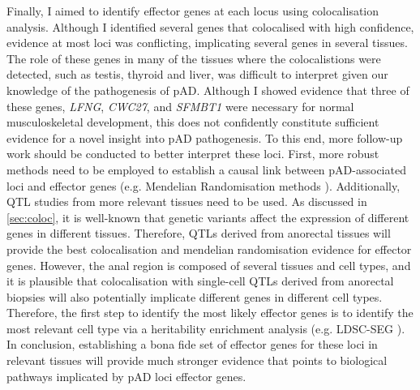 Finally, I aimed to identify effector genes at each locus using colocalisation analysis. Although I identified several genes that colocalised with high confidence, evidence at most loci was conflicting, implicating several genes in several tissues. The role of these genes in many of the tissues where the colocalistions were detected, such as testis, thyroid and liver, was difficult to interpret given our knowledge of the pathogenesis of pAD. Although I showed evidence that three of these genes, \textit{LFNG}, \textit{CWC27}, and \textit{SFMBT1} were necessary for normal musculoskeletal development, this does not confidently constitute sufficient evidence for a novel insight into pAD pathogenesis. To this end, more follow-up work should be conducted to better interpret these loci. First, more robust methods need to be employed to establish a causal link between pAD-associated loci and effector genes (e.g. Mendelian Randomisation methods \cite{Sanderson2022-nm}). Additionally, QTL studies from more relevant tissues need to be used. As discussed in \ref{sec:coloc}, it is well-known that genetic variants affect the expression of different genes in different tissues. Therefore, QTLs derived from anorectal tissues will provide the best colocalisation and mendelian randomisation evidence for effector genes. However, the anal region is composed of several tissues and cell types, and it is plausible that colocalisation with single-cell QTLs derived from anorectal biopsies will also potentially implicate different genes in different cell types. Therefore, the first step to identify the most likely effector genes is to identify the most relevant cell type via a heritability enrichment analysis (e.g. LDSC-SEG \cite{Finucane2018-mx}). In conclusion, establishing a bona fide set of effector genes for these loci in relevant tissues will provide much stronger evidence that points to biological pathways implicated by pAD loci effector genes. 
